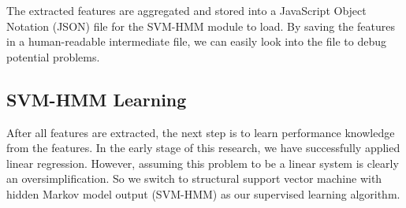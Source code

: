   The extracted features are aggregated and stored into a JavaScript Object Notation (JSON) file for the SVM-HMM module to load. By saving the features in a human-readable intermediate file, we can easily look into the file to debug potential problems.%


\subsection{SVM-HMM Learning}
After all features are extracted, the next step is to learn performance knowledge from the features. In the early stage of this research, we have successfully applied linear regression\cite{Lyu2012}. However, assuming this problem to be a linear system is clearly an oversimplification. So we switch to structural support vector machine with hidden Markov model output (SVM-HMM)\cite{svm2009, svm2005, svm2003} as our supervised learning algorithm. 

